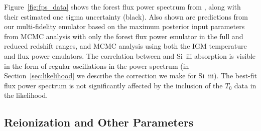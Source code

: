Figure~\ref{fig:fps_data} shows the \lya forest flux power spectrum from \cite{2019JCAP...07..017C}, along with their estimated one sigma uncertainty (black).
Also shown are predictions from our multi-fidelity emulator based on the maximum posterior input parameters from MCMC analysis with only the \lya forest flux power emulator in the full and reduced redshift ranges, and MCMC analysis using both the IGM temperature and flux power emulators.
The correlation between \lya and Si~{\sc iii} absorption is visible in the form of regular oscillations in the power spectrum (in Section~\ref{sec:likelihood} we describe the correction we make for Si~{\sc iii}).
The best-fit flux power spectrum is not significantly affected by the inclusion of the $T_0$ data in the likelihood. %


\subsection{Reionization and Other Parameters}\label{sec:astro}

